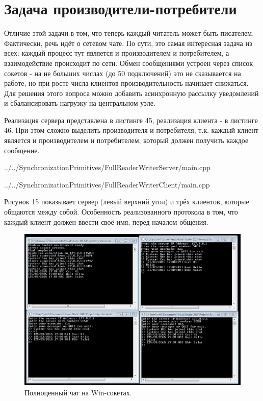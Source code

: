 \documentclass[a4paper, 12pt]{article}		%
\begin{document}
\newpage
\section{Задача производители-потребители}

Отличие этой задачи в том, что теперь каждый читатель может быть писателем. Фактически, речь идёт о сетевом чате. По сути, это самая интересная задача из всех: каждый процесс тут является и производителем и потребителем, а взаимодействие происходит по сети. Обмен сообщениями устроен через список сокетов - на не больших числах (до 50 подключений) это не сказывается на работе, но при росте числа клиентов производительность начинает снижаться. Для решения этого вопроса можно добавить асинхронную рассылку уведомлений и сбалансировать нагрузку на центральном узле.

Реализация сервера представлена в листинге 45, реализация клиента - в листинге 46. При этом сложно выделить производителя и потребителя, т.к. каждый клиент является и производителем и потребителем, который должен получить каждое сообщение.


{../../SynchronizationPrimitives/FullReaderWriterServer/main.cpp}


{../../SynchronizationPrimitives/FullReaderWriterClient/main.cpp}

Рисунок 15 показывает сервер (левый верхний угол) и трёх клиентов, которые общаются между собой. Особенность реализованного протокола в том, что каждый клиент должен ввести своё имя, перед началом общения.

\begin{figure}[h!]
\centering
\includegraphics[scale=0.7]{res/009}
\caption{Полноценный чат на Win-сокетах.}
\end{figure}
\end{document}
